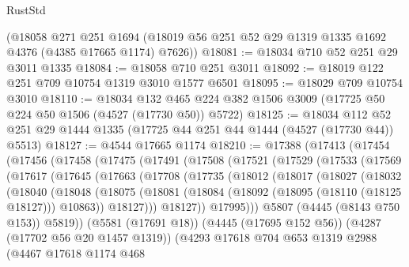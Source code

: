 \begin{lexlean}{RustStd}
\begin{coremodule}
    (@18058
      @271
      @251
      @1694
      (@18019 @56 @251 @52 @29 @1319 @1335 @1692 @4376 (@4385 @17665 @1174) @7626))
@18081 := @18034 @710 @52 @251 @29 @3011 @1335
@18084 := @18058 @710 @251 @3011
@18092 := @18019 @122 @251 @709 @10754 @1319 @3010 @1577 @6501
@18095 := @18029 @709 @10754 @3010
@18110 := @18034
    @132
    @465
    @224
    @382
    @1506
    @3009
    (@17725 @50 @224 @50 @1506 (@4527 (@17730 @50)) @5722)
@18125 := @18034
    @112
    @52
    @251
    @29
    @1444
    @1335
    (@17725 @44 @251 @44 @1444 (@4527 (@17730 @44)) @5513)
@18127 := @4544 @17665 @1174
@18210 := @17388
    (@17413
      (@17454
        (@17456
          (@17458
            (@17475
              (@17491
                (@17508
                  (@17521
                    (@17529
                      (@17533
                        (@17569
                          (@17617
                            (@17645
                              (@17663
                                (@17708
                                  (@17735
                                    (@18012
                                      (@18017
                                        (@18027
                                          (@18032
                                            (@18040
                                              (@18048
                                                (@18075
                                                  (@18081
                                                    (@18084
                                                      (@18092
                                                        (@18095 (@18110 (@18125 @18127)))
                                                        @10863))
                                                    @18127)))
                                              @18127))
                                          @17995)))
                                    @5807
                                    (@4445 (@8143 @750 @153))
                                    @5819))
                                (@5581 (@17691 @18))
                                (@4445 (@17695 @152 @56))
                                (@4287 (@17702 @56 @20 @1457 @1319))
                                (@4293
                                  @17618
                                  @704
                                  @653
                                  @1319
                                  @2988
                                  (@4467
                                    @17618
                                    @1174
                                    @468

\end{coremodule}
\end{lexlean}
